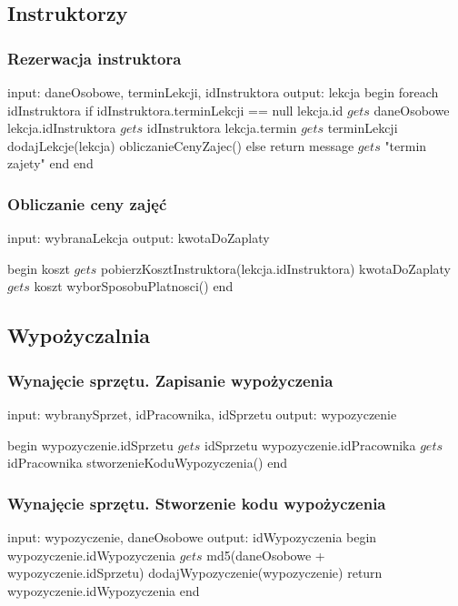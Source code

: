 \subsection{Instruktorzy}
\subsubsection{Rezerwacja instruktora}
\begin{algorithm}[caption={3.1 Rezerwacja instruktora}, label={alg1}]
  input: daneOsobowe, terminLekcji, idInstruktora
  output: lekcja
begin
  foreach idInstruktora
    if idInstruktora.terminLekcji == null 
      lekcja.id $gets$ daneOsobowe
      lekcja.idInstruktora $gets$ idInstruktora
      lekcja.termin $gets$ terminLekcji
      dodajLekcje(lekcja)
      obliczanieCenyZajec()
    else
      return message $gets$ "termin zajety"
  end
end
\end{algorithm}

\subsubsection{Obliczanie ceny zajęć}
\begin{algorithm}[caption={3.2 Obliczanie ceny zajęć}, label={alg1}]
  input: wybranaLekcja
  output: kwotaDoZaplaty

begin  
  koszt $gets$ pobierzKosztInstruktora(lekcja.idInstruktora)
  kwotaDoZaplaty $gets$ koszt
  wyborSposobuPlatnosci()
end
\end{algorithm}

\newpage
\subsection{Wypożyczalnia}
\subsubsection{Wynajęcie sprzętu. Zapisanie wypożyczenia}
\begin{algorithm}[caption={4.1.1 Wynajęcie sprzętu. Zapisanie wypożyczenia}, label={alg1}]
  input: wybranySprzet, idPracownika, idSprzetu
  output: wypozyczenie
  
begin
  wypozyczenie.idSprzetu $gets$ idSprzetu
  wypozyczenie.idPracownika $gets$ idPracownika
  stworzenieKoduWypozyczenia()
end
\end{algorithm}

\subsubsection{Wynajęcie sprzętu. Stworzenie kodu wypożyczenia}
\begin{algorithm}[caption={4.1.2 Wynajęcie sprzętu. Stworzenie kodu wypożyczenia}, label={alg1}]
  input: wypozyczenie, daneOsobowe
  output: idWypozyczenia
begin
  wypozyczenie.idWypozyczenia $gets$ md5(daneOsobowe + wypozyczenie.idSprzetu)
  dodajWypozyczenie(wypozyczenie)
  return wypozyczenie.idWypozyczenia
end
\end{algorithm}

